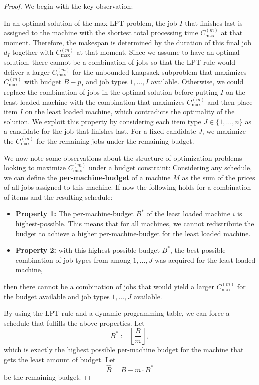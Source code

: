\begin{proof}
We begin with the key observation:

In an optimal solution of the max-LPT problem, the job $I$ that finishes last is assigned to the machine with the shortest total processing time $C_{\max}^{(m)}$ at that moment. 
Therefore, the makespan is determined by the duration of this final job $d_I$ together with $C_{\max}^{(m)}$ at that moment.
Since we assume to have an optimal solution, there cannot be a combination of jobs so that the LPT rule would deliver a larger $C_{\max}^{(m)}$ for the unbounded knapsack subproblem that 
maximizes $C_{\max}^{(m)}$ with  budget $B - p_I$ and job types $1, \ldots, I$ available.
Otherwise, we could replace the combination of jobs in the optimal solution before putting $I$ on the least loaded machine with the combination that maximizes $C_{\max}^{(m)}$ and then place item $I$ on the least loaded machine,
 which contradicts the optimality of the solution.
We exploit this property by considering each item type $J \in \{1, \ldots, n\}$ as a candidate for the job that finishes last. For a fixed candidate $J$, we maximize the $C_{\max}^{(m)}$ for the remaining jobs under the remaining budget.

We now note some observations about the structure of optimization problems looking to maximize $C_{\max}^{(m)}$ under a budget constraint:
Considering any schedule, we can define the \textbf{per-machine-budget} of a machine $M$ as the sum of the prices of all jobs assigned to this machine. 
If now the following holds for a combination of items and the resulting schedule:
\begin{itemize}
    \item \textbf{Property 1:} The per-machine-budget $B^*$ of the least loaded machine $i$ is highest-possible. This means that for all machines, we cannot redistribute the budget to achieve a higher per-machine-budget for the least loaded machine.
    \item \textbf{Property 2:} with this highest possible budget $B^*$, the best possible combination of job types from among $1, \ldots, J$ was acquired for the least loaded machine,
\end{itemize}
then there cannot be a combination of jobs that would yield a larger $C_{\max}^{(m)}$ for the budget available and job types $1, \ldots, J$ available.

By using the LPT rule and a dynamic programming table, we can force a schedule that fulfills the above properties. Let
\[
B^* := \left\lfloor \frac{B}{m} \right\rfloor,
\]
 which is exactly the highest possible per-machine budget for the machine that gets the least amount of budget. Let
\[
\hat{B} = B - m \cdot B^*
\]
be the remaining budget.


\end{proof}
